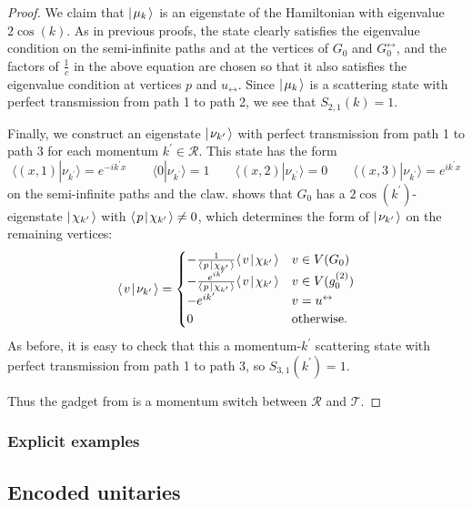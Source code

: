\documentclass[../thesis-main/thesis-main]{subfiles}
\begin{document}
\begin{proof}
We claim that $|\mspace{2mu} \mu_k \mspace{2mu} \rangle$ is an eigenstate of the Hamiltonian with eigenvalue $2\cos(k)$.  As in previous proofs, the state clearly satisfies the eigenvalue condition on the semi-infinite paths and at the vertices of $G_0$ and $G_0^\leftrightarrow$, and the factors of $\frac{1}{c}$ in the above equation are chosen so that it also satisfies the eigenvalue condition at vertices $p$ and $u_\leftrightarrow$. Since $|\mspace{2mu} \mu_k \mspace{2mu} \rangle$ is a scattering state with perfect transmission from path 1 to path 2, we see that $S_{2,1}(k) = 1$.

Finally, we construct an eigenstate $|\mspace{2mu} \nu_{k^\prime} \mspace{2mu} \rangle$ with perfect transmission from path 1 to path 3 for each momentum $k^\prime \in \mathcal{R}$.  This state has the form
\[
  \langle (x,1)|\nu_{k^\prime}\rangle=e^{-i k^\prime x} \qquad 
  \langle 0|\nu_{k^\prime}\rangle=1 \qquad 
  \langle (x,2)|\nu_{k^\prime}\rangle=0 \qquad
  \langle (x,3)|\nu_{k^\prime}\rangle=e^{i k^\prime x}
\]
on the semi-infinite paths and the claw.   shows that $G_0$ has a $2\cos(k^\prime)$-eigenstate $|\mspace{2mu} \chi_{k^\prime} \mspace{2mu} \rangle$ with $\langle\mspace{2mu} p \mspace{2mu} | \mspace{2mu} \chi_{k'}\mspace{2mu} \rangle \ne 0$, which determines the form of $|\mspace{2mu} \nu_{k^\prime} \mspace{2mu} \rangle$ on the remaining vertices:
\[
  \langle\mspace{2mu} v \mspace{2mu} | \mspace{2mu} \nu_{k^\prime}\mspace{2mu} \rangle =
  \begin{cases}
	  -\frac{1}{\langle\mspace{2mu} p \mspace{2mu} | \mspace{2mu} \chi_{k'}\mspace{2mu} \rangle} \langle\mspace{2mu} v \mspace{2mu} | \mspace{2mu} \chi_{k^\prime}\mspace{2mu} \rangle & v \in V(G_0) \\
	  -\frac{e^{ik'}}{\langle\mspace{2mu} p \mspace{2mu} | \mspace{2mu} \chi_{k'}\mspace{2mu} \rangle} \langle\mspace{2mu} v \mspace{2mu} | \mspace{2mu} \chi_{k^\prime}\mspace{2mu} \rangle & v \in V(g_0^{(2)}) \\
	  -e^{ik'} & v=u^\leftrightarrow \\
    0 & \text{otherwise}.
  \end{cases} 
\]
As before, it is easy to check that this a momentum-$k^\prime$ scattering state with perfect transmission from path 1 to path 3, so $S_{3,1}(k^\prime)=1$.

Thus the gadget from  is a momentum switch between $\mathcal{R}$ and $\mathcal{T}$.
\end{proof}

\subsubsection{Explicit examples}





\subsection{Encoded unitaries}
\end{document}
